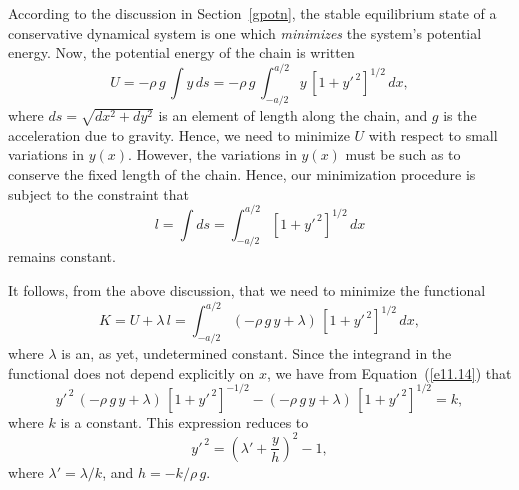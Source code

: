 According to the discussion in Section~\ref{gpotn}, the stable equilibrium
state of a conservative dynamical system is one which {\em minimizes}\/
the system's potential energy. Now, the potential energy of the chain
is written
\begin{equation}
U = - \rho\,g\,\int y\,ds = - \rho\,g\,\int_{-a/2}^{a/2} y\,[1+y'^{\,2}]^{1/2}\,dx,
\end{equation}
where $ds = \sqrt{dx^2+dy^2}$ is an element of length along the chain, and
$g$ is the acceleration due to gravity.
Hence, we need to minimize $U$ with respect to small variations in $y(x)$. 
However, the variations in $y(x)$ must be such as to conserve the
fixed length of the chain. Hence, our minimization procedure is subject to
the constraint that
\begin{equation}\label{e11.21}
l = \int ds = \int_{-a/2}^{a/2}[1+y'^{\,2}]^{1/2}\,dx
\end{equation} 
remains constant.

It follows, from the above discussion, that we need to minimize the
functional
\begin{equation}
K = U + \lambda\,l = \int_{-a/2}^{a/2}(-\rho\,g\,y+\lambda)\,[1+y'^{\,2}]^{1/2}\,dx,
\end{equation}
where $\lambda$ is an, as yet, undetermined constant. Since the integrand
in the functional does not depend explicitly on $x$, we have
from Equation~(\ref{e11.14}) that
\begin{equation}
y'^{\,2}\,(-\rho\,g\,y+\lambda)\,[1+y'^{\,2}]^{-1/2} - (-\rho\,g\,y+\lambda)\,[1+y'^{\,2}]^{1/2} = k,
\end{equation}
where $k$ is a constant. This expression reduces to
\begin{equation}\label{e11.24}
y'^{\,2} = \left(\lambda' + \frac{y}{h}\right)^2 - 1,
\end{equation}
where $\lambda' = \lambda/k$, and $h=-k/\rho\,g$. 

